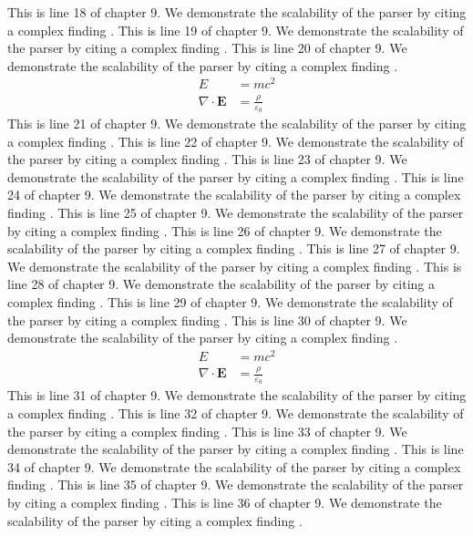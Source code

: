 This is line 18 of chapter 9. We demonstrate the scalability of the parser by citing a complex finding \cite{ref9_18}.
This is line 19 of chapter 9. We demonstrate the scalability of the parser by citing a complex finding \cite{ref9_19}.
This is line 20 of chapter 9. We demonstrate the scalability of the parser by citing a complex finding \cite{ref9_20}.
\begin{align*}
  E &= mc^2 \\
  \nabla \cdot \mathbf{E} &= \frac{\rho}{\varepsilon_0}
\end{align*}
This is line 21 of chapter 9. We demonstrate the scalability of the parser by citing a complex finding \cite{ref9_21}.
This is line 22 of chapter 9. We demonstrate the scalability of the parser by citing a complex finding \cite{ref9_22}.
This is line 23 of chapter 9. We demonstrate the scalability of the parser by citing a complex finding \cite{ref9_23}.
This is line 24 of chapter 9. We demonstrate the scalability of the parser by citing a complex finding \cite{ref9_24}.
This is line 25 of chapter 9. We demonstrate the scalability of the parser by citing a complex finding \cite{ref9_25}.
This is line 26 of chapter 9. We demonstrate the scalability of the parser by citing a complex finding \cite{ref9_26}.
This is line 27 of chapter 9. We demonstrate the scalability of the parser by citing a complex finding \cite{ref9_27}.
This is line 28 of chapter 9. We demonstrate the scalability of the parser by citing a complex finding \cite{ref9_28}.
This is line 29 of chapter 9. We demonstrate the scalability of the parser by citing a complex finding \cite{ref9_29}.
This is line 30 of chapter 9. We demonstrate the scalability of the parser by citing a complex finding \cite{ref9_30}.
\begin{align*}
  E &= mc^2 \\
  \nabla \cdot \mathbf{E} &= \frac{\rho}{\varepsilon_0}
\end{align*}
This is line 31 of chapter 9. We demonstrate the scalability of the parser by citing a complex finding \cite{ref9_31}.
This is line 32 of chapter 9. We demonstrate the scalability of the parser by citing a complex finding \cite{ref9_32}.
This is line 33 of chapter 9. We demonstrate the scalability of the parser by citing a complex finding \cite{ref9_33}.
This is line 34 of chapter 9. We demonstrate the scalability of the parser by citing a complex finding \cite{ref9_34}.
This is line 35 of chapter 9. We demonstrate the scalability of the parser by citing a complex finding \cite{ref9_35}.
This is line 36 of chapter 9. We demonstrate the scalability of the parser by citing a complex finding \cite{ref9_36}.
